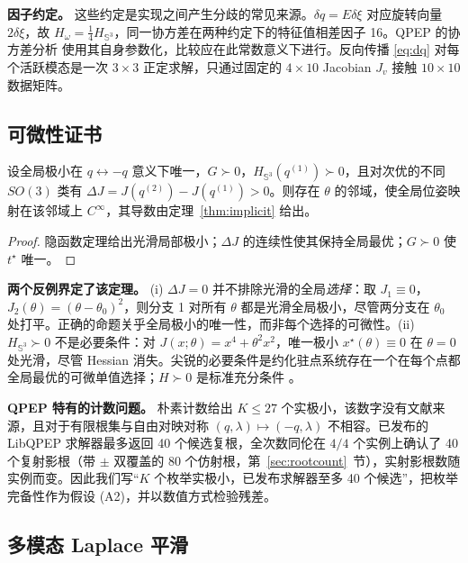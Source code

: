\textbf{因子约定。} 这些约定是实现之间产生分歧的常见来源。$\delta q=E\delta\xi$ 对应旋转向量 $2\delta\xi$，故 $H_\omega=\tfrac14H_{\mathbb{S}^3}$，同一协方差在两种约定下的特征值相差因子 16。QPEP 的协方差分析 \cite{wu2022qpep} 使用其自身参数化，比较应在此常数意义下进行。反向传播 \eqref{eq:dq} 对每个活跃模态是一次 $3\times3$ 正定求解，只通过固定的 $4\times10$ Jacobian $J_v$ 接触 $10\times10$ 数据矩阵。

\subsection{可微性证书}\label{sec:cert}

\begin{theorem}[充分条件]\label{thm:cert}
设全局极小在 $q\leftrightarrow-q$ 意义下唯一，$G\succ0$，$H_{\mathbb{S}^3}(q^{(1)})\succ0$，且对次优的不同 $SO(3)$ 类有 $\Delta J=J(q^{(2)})-J(q^{(1)})>0$。则存在 $\theta$ 的邻域，使全局位姿映射在该邻域上 $C^\infty$，其导数由定理~\ref{thm:implicit} 给出。
\end{theorem}

\begin{proof}
隐函数定理给出光滑局部极小；$\Delta J$ 的连续性使其保持全局最优；$G\succ0$ 使 $t^\star$ 唯一。
\end{proof}

\textbf{两个反例界定了该定理。} (i) $\Delta J=0$ 并不排除光滑的全局\emph{选择}：取 $J_1\equiv0$，$J_2(\theta)=(\theta-\theta_0)^2$，则分支 1 对所有 $\theta$ 都是光滑全局极小，尽管两分支在 $\theta_0$ 处打平。正确的命题关乎全局极小的唯一性，而非每个选择的可微性。(ii) $H_{\mathbb{S}^3}\succ0$ 不是必要条件：对 $J(x;\theta)=x^4+\theta^2x^2$，唯一极小 $x^\star(\theta)\equiv0$ 在 $\theta=0$ 处光滑，尽管 Hessian 消失。尖锐的必要条件是约化驻点系统存在一个在每个点都全局最优的可微单值选择；$H\succ0$ 是标准充分条件 \cite{dontchev2009}。

\textbf{QPEP 特有的计数问题。} 朴素计数给出 $K\le27$ 个实极小，该数字没有文献来源，且对于有限根集与自由对映对称 $(q,\lambda)\mapsto(-q,\lambda)$ 不相容。已发布的 LibQPEP 求解器最多返回 40 个候选复根，全次数同伦在 $4/4$ 个实例上确认了 40 个复射影根（带 $\pm$ 双覆盖的 80 个仿射根，第~\ref{sec:rootcount}~节），实射影根数随实例而变。因此我们写“$K$ 个枚举实极小，已发布求解器至多 40 个候选”，把枚举完备性作为假设 (A2)，并以数值方式检验残差。

\subsection{多模态 Laplace 平滑}\label{sec:laplace}

